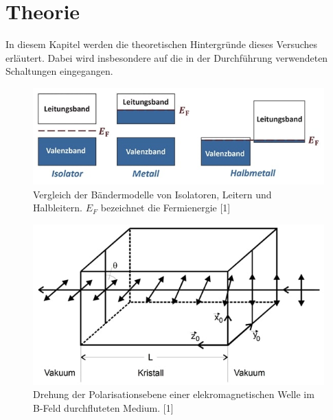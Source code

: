\section{Theorie} 
\label{sec:Theorie}

In diesem Kapitel werden die theoretischen Hintergründe dieses Versuches erläutert. Dabei wird insbesondere auf die in der Durchführung verwendeten Schaltungen eingegangen.

\begin{figure}
    \centering
    \includegraphics[width=1\textwidth]{content/grafiken/baender.JPG}
    \caption{Vergleich der Bändermodelle von Isolatoren, Leitern und Halbleitern. $E_F$ bezeichnet die Fermienergie [1]}
    \label{fig:baendermodell}
  \end{figure}

  \begin{figure}
    \centering
    \includegraphics[width=1\textwidth]{content/grafiken/kristall.JPG}
    \caption{Drehung der Polarisationsebene einer elekromagnetischen Welle im B-Feld durchfluteten Medium. [1]}
    \label{fig:kristall}
  \end{figure}